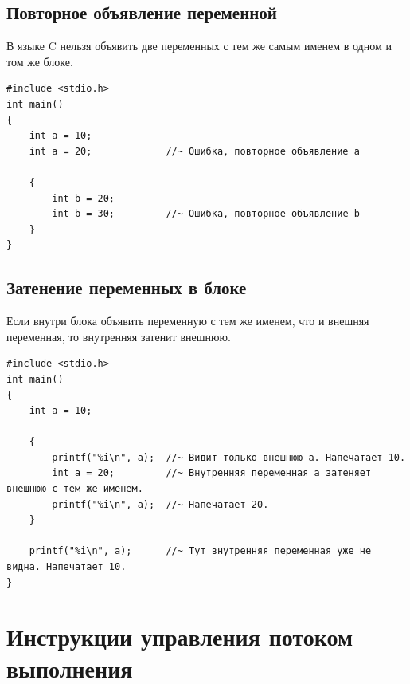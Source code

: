 \documentclass{article}
\begin{document}
\subsection*{Повторное объявление переменной}
В языке C нельзя объявить две переменных с тем же самым именем в одном и том же блоке. 
\begin{lstlisting}
#include <stdio.h>
int main() 
{
    int a = 10;
    int a = 20;				//~ Ошибка, повторное объявление a
    
    {
        int b = 20;			
        int b = 30;			//~ Ошибка, повторное объявление b
    }
}
\end{lstlisting}


\subsection*{Затенение переменных в блоке}
Если внутри блока объявить переменную с тем же именем, что и внешняя переменная, то внутренняя затенит внешнюю.
\begin{lstlisting}
#include <stdio.h>
int main() 
{
    int a = 10;
    
    {
        printf("%i\n", a);  //~ Видит только внешнюю a. Напечатает 10.
        int a = 20;			//~ Внутренняя переменная a затеняет внешнюю с тем же именем.
        printf("%i\n", a);  //~ Напечатает 20.
    }
    
    printf("%i\n", a);  	//~ Тут внутренняя переменная уже не видна. Напечатает 10.
}
\end{lstlisting}



\newpage
\section*{Инструкции управления потоком выполнения}
\end{document}
